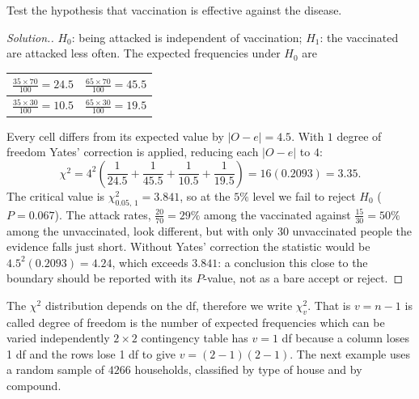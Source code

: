 \documentclass[11pt,a4paper]{article}
\theoremstyle{definition}
\newenvironment{solution}
  {\renewcommand{\qedsymbol}{}\begin{proof}[\textit{Solution}.]}
  {\end{proof}}
\begin{document}
Test the hypothesis that vaccination is effective against the disease.\\[1ex]


\begin{solution}
$H_0$: being attacked is independent of vaccination; $H_1$: the vaccinated are attacked
less often. The expected frequencies under $H_0$ are
\begin{table}[H]
\centering
\begin{tabular}{|c|c|}
\hline
$\frac{35\times 70}{100}=24.5$ & $\frac{65\times 70}{100}=45.5$\\
\hline
$\frac{35\times 30}{100}=10.5$ & $\frac{65\times 30}{100}=19.5$\\
\hline
\end{tabular}
\end{table}
Every cell differs from its expected value by $|O - e| = 4.5$. With $1$ degree of freedom
Yates' correction is applied, reducing each $|O - e|$ to $4$:
\[\chi^2 = 4^2\left(\frac{1}{24.5} + \frac{1}{45.5} + \frac{1}{10.5} + \frac{1}{19.5}\right) = 16(0.2093) = 3.35 .\]
The critical value is $\chi^2_{0.05,\,1} = 3.841$, so at the $5\%$ level we fail to reject
$H_0$ ($P = 0.067$). The attack rates, $\frac{20}{70} = 29\%$ among the vaccinated against
$\frac{15}{30} = 50\%$ among the unvaccinated, look different, but with only $30$ unvaccinated
people the evidence falls just short. Without Yates' correction the statistic would be
$4.5^2(0.2093) = 4.24$, which exceeds $3.841$: a conclusion this close to the boundary should
be reported with its $P$-value, not as a bare accept or reject.
\end{solution}



\vspace{1cm}
The $\chi^2$ distribution depends on the df, therefore we write $\chi^2_v$. That is $v=n-1$ is called degree of freedom is the number of expected frequencies which can be varied independently $2\times 2$ contingency table has $v=1$ df because a column loses 1 df and the rows lose 1 df to give $v=(2-1)(2-1)$. The next example uses a random sample of $4266$ households, classified by type of house and by compound.
\end{document}
